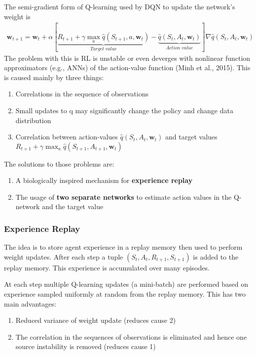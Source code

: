 The semi-gradient form of Q-learning used by DQN to update the network’s weight is
\begin{align}
    \mathbf{w}_{t+1}=\mathbf{w}_t+\alpha[\underbrace{R_{t+1}+\gamma\max_a\hat{q}(S_{t+1}, a, \mathbf{w}_t)}_{Target\;value}-\underbrace{\hat{q}(S_t, A_t, \mathbf{w}_t)}_{Action\;value}]\nabla \hat{q}(S_t, A_t, \mathbf{w}_t)
\end{align}
The problem with this is RL is unstable or even deverges with nonlinear function approximators (e.g., ANNs) of the action-value function (Minh et al., 2015).
This is caused mainly by three things:
\begin{enumerate}
    \item Correlations in the sequence of observations
    \item Small updates to q may significantly change the policy and change data distribution
    \item Correlation between action-values $\hat{q}(S_t, A_t, \mathbf{w}_t)$ and target values $R_{t+1}+\gamma\max_a\hat{q}(S_{t+1}, A_{t+1}, \mathbf{w}_t)$
\end{enumerate}
The solutions to those problems are:
\begin{enumerate}
    \item A biologically inspired mechanism for \textbf{experience replay}
    \item The usage of \textbf{two separate networks} to estimate action values in the Q-network and the target value
\end{enumerate}
\subsubsection{Experience Replay}
The idea is to store agent experience in a replay memory then used to perform weight updates. After each step a tuple $(S_t, A_t, R_{t+1}, S_{t+1})$ is added to the replay memory. This experience is accumulated over many episodes.

At each step  multiple Q-learning updates (a mini-batch) are performed based on experience sampled uniformly at random from the replay memory.
This has two main advantages:
\begin{enumerate}
    \item Reduced variance of weight update (reduces cause 2)
    \item The correlation in the sequences of observations is eliminated and hence one source instability is removed (reduces cause 1)
\end{enumerate}
